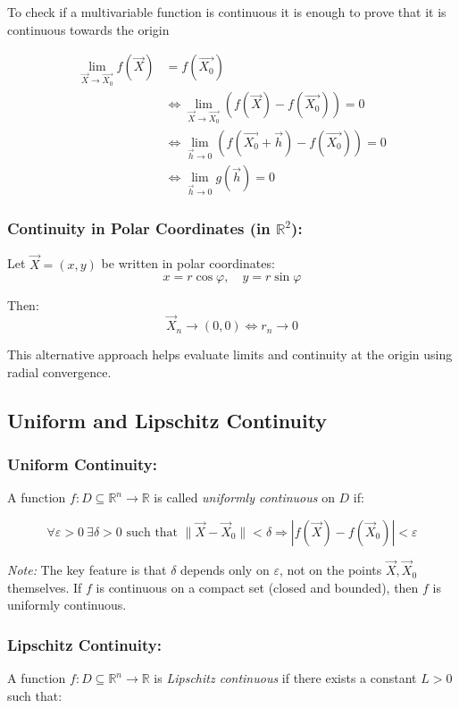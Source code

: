 To check if a multivariable function is continuous it is enough to prove that it is continuous towards the origin

\begin{align*}
    \lim_{\vec{X} \to \vec{X_0}}f(\vec{X}) &= f(\vec{X_0}) \\
    &\iff \lim_{\vec{X} \to \vec{X_0}} \left(f(\vec{X}) - f(\vec{X_0})\right) = 0 \\
    &\iff \lim_{\vec{h} \to 0} \left(f(\vec{X_0} + \vec{h}) - f(\vec{X_0})\right) = 0 \\
    &\iff \lim_{\vec{h} \to 0} g(\vec{h}) = 0
\end{align*}

\subsubsection{Continuity in Polar Coordinates (in \( \mathbb{R}^2 \)):}

Let \( \vec{X} = (x, y) \) be written in polar coordinates:
\[
x = r \cos \varphi, \quad y = r \sin \varphi
\]

Then:
\[
\vec{X}_n \to (0, 0) \iff r_n \to 0
\]

This alternative approach helps evaluate limits and continuity at the origin using radial convergence.

\subsection{Uniform and Lipschitz Continuity}

\subsubsection{Uniform Continuity:}  
A function \( f : D \subseteq \mathbb{R}^n \to \mathbb{R} \) is called \emph{uniformly continuous} on \( D \) if:

\[
\forall \varepsilon > 0 \ \exists \delta > 0 \text{ such that } \|\vec{X} - \vec{X}_0\| < \delta \Rightarrow |f(\vec{X}) - f(\vec{X}_0)| < \varepsilon
\]

\textit{Note:} The key feature is that \( \delta \) depends only on \( \varepsilon \), not on the points \( \vec{X}, \vec{X}_0 \) themselves.  
If \( f \) is continuous on a compact set (closed and bounded), then \( f \) is uniformly continuous.

\subsubsection{Lipschitz Continuity:}  
A function \( f : D \subseteq \mathbb{R}^n \to \mathbb{R} \) is \emph{Lipschitz continuous} if there exists a constant \( L > 0 \) such that:

